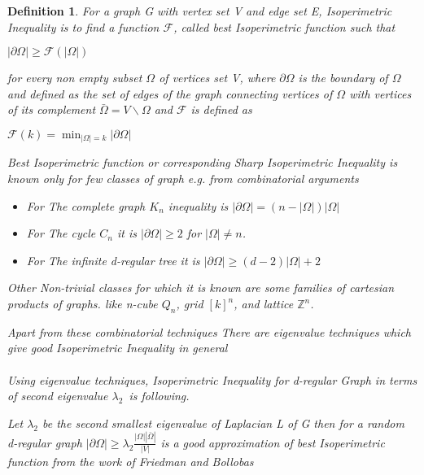 \documentclass[oneside]{book}
\newtheorem{mydef}{Definition}
\begin{document}
\begin{mydef}
  
For a graph G with vertex set V and edge set E, Isoperimetric Inequality is to find a function $\mathcal{F}$, called best  Isoperimetric function such that  \begin{center}
  $|\partial \Omega| \geq \mathcal{F}(|\Omega|)$  
\end{center}   
for every non empty subset $\Omega$ of vertices set V, where $\partial \Omega$ is the boundary of $\Omega$  and defined as the set of edges of the graph connecting vertices of $\Omega$ with vertices of its complement $\bar{\Omega} = V \backslash \Omega $ and $\mathcal{F}$ is defined as  \begin{center}
    $\mathscr{F}(k)=\min _{|\Omega|=k}|\partial \Omega|$\par
\end{center} 
 Best Isoperimetric function or corresponding Sharp Isoperimetric Inequality is known only for few classes of graph e.g.
from combinatorial arguments 
\par
\begin{itemize}
    \item For The complete graph $K_{n}$ inequality is $|\partial \Omega|=(n-|\Omega|) | \Omega|$ 
    \item For The cycle $C_{n}$ it is  $|\partial \Omega|\geq 2$ for $|\Omega| \neq n$.
    \item For The infinite d-regular tree it is $|\partial \Omega| \geq(d-2)| \Omega|+2$\par
\end{itemize}
 
  
     
     Other Non-trivial classes for which it is known are some families of cartesian products of graphs. like 
n-cube $Q_{n}$, 
grid $[k]^{n}$,
and lattice $\mathbb{Z}^{n}$.
\par
 Apart from these combinatorial techniques There are eigenvalue techniques which give good Isoperimetric Inequality in general \\\\
 
 Using eigenvalue techniques, 
 Isoperimetric Inequality for d-regular Graph in terms of second eigenvalue $\lambda_2$\ is following. \par
  
 Let $\lambda_{2}$ be the second smallest eigenvalue of Laplacian L of G then for a random d-regular graph $|\partial \Omega| \geq \lambda_{2} \frac{|\Omega||\bar{\Omega}|}{|V|}$  is a good approximation of best Isoperimetric function from the work of Friedman and Bollobas  \par 
     

\end{mydef}
\end{document}

